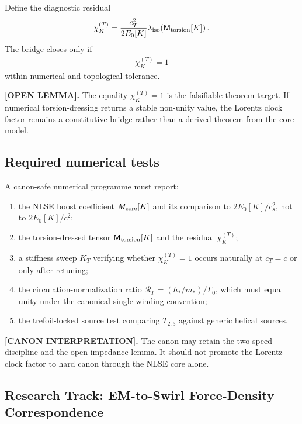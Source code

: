Define the diagnostic residual
\begin{align}
    \chi_K^{(T)}
    =
    \frac{c_T^2}{2E_0[K]}
    \lambda_{\rm iso}\!\left(\mathsf M_{\rm torsion}[K]\right).
\end{align}
The bridge closes only if
\begin{align}
    \chi_K^{(T)}=1
\end{align}
within numerical and topological tolerance.

\textbf{[OPEN LEMMA].}
The equality \(\chi_K^{(T)}=1\) is the falsifiable theorem target. If numerical torsion-dressing returns a stable non-unity value, the Lorentz clock factor remains a constitutive bridge rather than a derived theorem from the core model.

\subsection{Required numerical tests}

A canon-safe numerical programme must report:
\begin{enumerate}
    \item the NLSE boost coefficient \(M_{\rm core}[K]\) and its comparison to \(2E_0[K]/c_s^2\), not to \(2E_0[K]/c^2\);
    \item the torsion-dressed tensor \(\mathsf M_{\rm torsion}[K]\) and the residual \(\chi_K^{(T)}\);
    \item a stiffness sweep \(K_T\) verifying whether \(\chi_K^{(T)}=1\) occurs naturally at \(c_T=c\) or only after retuning;
    \item the circulation-normalization ratio \(\mathcal R_\Gamma=(h_*/m_*)/\Gamma_0\), which must equal unity under the canonical single-winding convention;
    \item the trefoil-locked source test comparing \(T_{2,3}\) against generic helical sources.
\end{enumerate}

\textbf{[CANON INTERPRETATION].}
The canon may retain the two-speed discipline and the open impedance lemma. It should not promote the Lorentz clock factor to hard canon through the NLSE core alone.



\subsection{Research Track: EM-to-Swirl Force-Density Correspondence}
\label{sec:research_em_to_swirl_force_density_correspondence}

